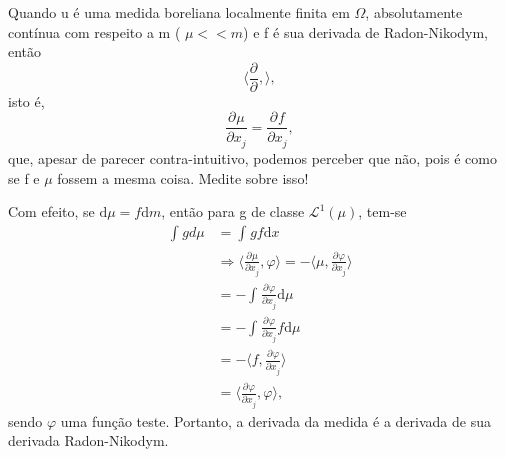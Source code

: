 \documentclass[../distribution_theory_notes.tex]{subfiles}
\begin{document}
               \begin{tcolorbox}[
               skin=enhanced,
               title=Observação,
               fonttitle=\bfseries,
             colframe=black,
               colbacktitle=cyan!75!white, 
               colback=cyan!15,
               colbacklower=black,
             coltitle=black,
               drop fuzzy shadow,
               ]
               Quando u é uma medida boreliana localmente finita em \(\Omega \), absolutamente contínua com respeito a m ( \(\mu << m\)) e f é sua derivada de Radon-Nikodym, então 
                 \[
                   \biggl\langle \frac{\partial^{}}{\partial ^{}},  \biggr\rangle,
                 \]
                 isto é, 
                   \[
                     \frac{\partial^{}\mu }{\partial x_{j}^{}} = \frac{\partial^{}f}{\partial x_{j}^{}},
                   \]
                   que, apesar de parecer contra-intuitivo, podemos perceber que não, pois é como se f e \(\mu \) fossem a mesma coisa. Medite sobre isso!

                   Com efeito, se \(\mathrm{d}\mu  = f \mathrm{d}m\), então para g de classe \(\mathcal{L}^{1}(\mu )\), tem-se 
                  \begin{align*}
                    \int_{}g d\mu_{} &= \int_{}gf \mathrm{d}x \\ 
                                     &\Rightarrow \biggl\langle \frac{\partial^{}\mu }{\partial x_{j}^{}}, \varphi  \biggr\rangle = - \biggl\langle \mu , \frac{\partial^{}\varphi }{\partial x_{j}^{}} \biggr\rangle\\ 
                                     &= - \int_{}^{}\frac{\partial^{}\varphi }{\partial x_{j}^{}} \mathrm{d}\mu \\ 
                                     &= - \int_{}\frac{\partial^{}\varphi }{\partial x_{j}^{}} f\mathrm{d}\mu_{}\\ 
                                     &= - \biggl\langle f, \frac{\partial^{}\varphi }{\partial x_{j}^{}} \biggr\rangle\\ 
                                     &= \biggl\langle \frac{\partial^{}\varphi }{\partial x_{j}^{}},  \varphi \biggr\rangle,
                  \end{align*}
                  sendo \(\varphi \) uma função teste. Portanto, a derivada da medida é a derivada de sua derivada Radon-Nikodym. 
               \end{tcolorbox}
\end{document}
